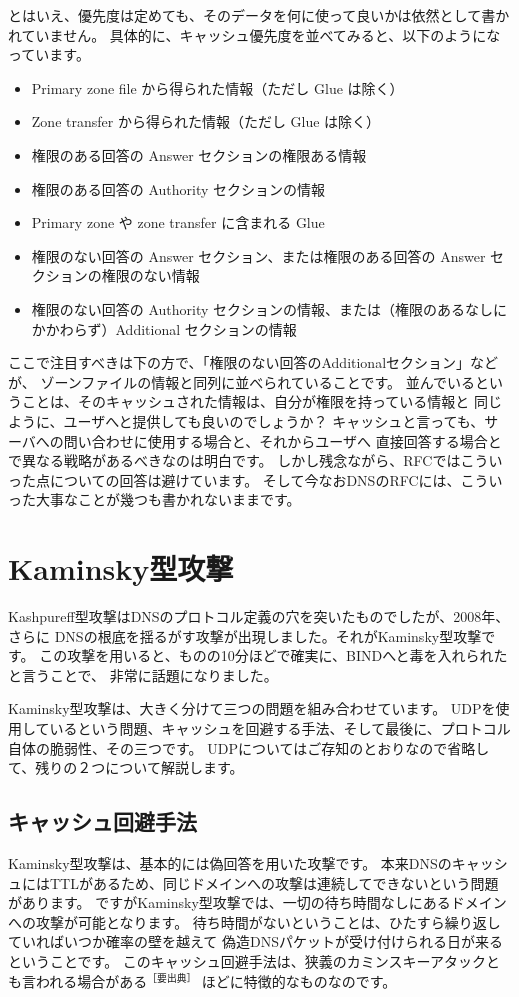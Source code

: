 とはいえ、優先度は定めても、そのデータを何に使って良いかは依然として書かれていません。
具体的に、キャッシュ優先度を並べてみると、以下のようになっています。

\begin{itemize}
  \item Primary zone file から得られた情報（ただし Glue は除く）
  \item Zone transfer から得られた情報（ただし Glue は除く）
  \item 権限のある回答の Answer セクションの権限ある情報
  \item 権限のある回答の Authority セクションの情報
  \item Primary zone や zone transfer に含まれる Glue
  \item 権限のない回答の Answer セクション、または権限のある回答の Answer セクションの権限のない情報
  \item 権限のない回答の Authority セクションの情報、または（権限のあるなしにかかわらず）Additional セクションの情報
\end{itemize}

ここで注目すべきは下の方で、「権限のない回答のAdditionalセクション」などが、
ゾーンファイルの情報と同列に並べられていることです。
並んでいるということは、そのキャッシュされた情報は、自分が権限を持っている情報と
同じように、ユーザへと提供しても良いのでしょうか？
キャッシュと言っても、サーバへの問い合わせに使用する場合と、それからユーザへ
直接回答する場合とで異なる戦略があるべきなのは明白です。
しかし残念ながら、RFCではこういった点についての回答は避けています。
そして今なおDNSのRFCには、こういった大事なことが幾つも書かれないままです。


\section{Kaminsky型攻撃}
Kashpureff型攻撃はDNSのプロトコル定義の穴を突いたものでしたが、2008年、さらに
DNSの根底を揺るがす攻撃が出現しました。それがKaminsky型攻撃です。
この攻撃を用いると、ものの10分ほどで確実に、BINDへと毒を入れられたと言うことで、
非常に話題になりました。

Kaminsky型攻撃は、大きく分けて三つの問題を組み合わせています。
UDPを使用しているという問題、キャッシュを回避する手法、そして最後に、プロトコル
自体の脆弱性、その三つです。
UDPについてはご存知のとおりなので省略して、残りの２つについて解説します。

\subsection{キャッシュ回避手法}
Kaminsky型攻撃は、基本的には偽回答を用いた攻撃です。
本来DNSのキャッシュにはTTLがあるため、同じドメインへの攻撃は連続してできないという問題があります。
ですがKaminsky型攻撃では、一切の待ち時間なしにあるドメインへの攻撃が可能となります。
待ち時間がないということは、ひたすら繰り返していればいつか確率の壁を越えて
偽造DNSパケットが受け付けられる日が来るということです。
このキャッシュ回避手法は、狭義のカミンスキーアタックとも言われる場合がある$^{［要出典］}$
ほどに特徴的なものなのです。

